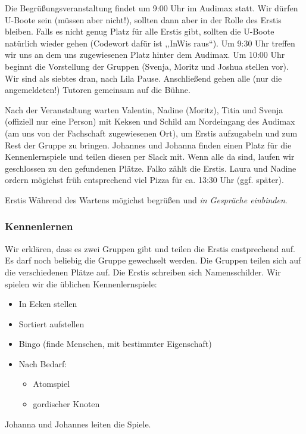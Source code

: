 \documentclass[10pt,ngerman]{scrartcl}
\begin{document}
\begin{multicols}{2}
Die Begrüßungsveranstaltung findet um 9:00 Uhr im Audimax statt. Wir
dürfen U-Boote sein (müssen aber nicht!), sollten dann aber in der
Rolle des Erstis bleiben. Falls es nicht genug Platz für alle Erstis
gibt, sollten die U-Boote natürlich wieder gehen (Codewort dafür ist
,,InWis raus``). Um 9:30 Uhr treffen wir uns an dem uns zugewiesenen
Platz hinter dem Audimax. Um 10:00 Uhr beginnt die Vorstellung der
Gruppen (Svenja, Moritz und Joshua stellen vor). Wir sind als siebtes
dran, nach Lila Pause. Anschließend gehen alle (nur die angemeldeten!)
Tutoren gemeinsam auf die Bühne.

Nach der Veranstaltung warten Valentin, Nadine (Moritz), Titia und
Svenja (offiziell nur eine Person) mit Keksen und Schild am Nordeingang
des Audimax (am uns von der Fachschaft zugewiesenen Ort), um Erstis
aufzugabeln und zum Rest der Gruppe zu bringen. Johannes und Johanna
finden einen Platz für die Kennenlernspiele und teilen diesen per
Slack mit. Wenn alle da sind, laufen wir geschlossen zu den gefundenen
Plätze. Falko zählt die Erstis. Laura und Nadine ordern mögichst
früh entsprechend viel Pizza für ca. 13:30 Uhr (ggf. später).

Erstis Während des Wartens mögichst begrüßen und \emph{in Gespräche einbinden}.

\subsubsection{Kennenlernen}

Wir erklären, dass es zwei Gruppen gibt und teilen die Erstis enstprechend
auf. Es darf noch beliebig die Gruppe gewechselt werden. Die Gruppen
teilen sich auf die verschiedenen Plätze auf. Die Erstis schreiben
sich Namensschilder. Wir spielen wir die üblichen Kennenlernspiele:
\begin{itemize}
    \item In Ecken stellen
    \item Sortiert aufstellen
    \item Bingo (finde Menschen, mit bestimmter Eigenschaft)
    \item Nach Bedarf:
          \begin{itemize}
              \item Atomspiel
              \item gordischer Knoten
          \end{itemize}
\end{itemize}
Johanna und Johannes leiten die Spiele.


\end{multicols}
\end{document}
